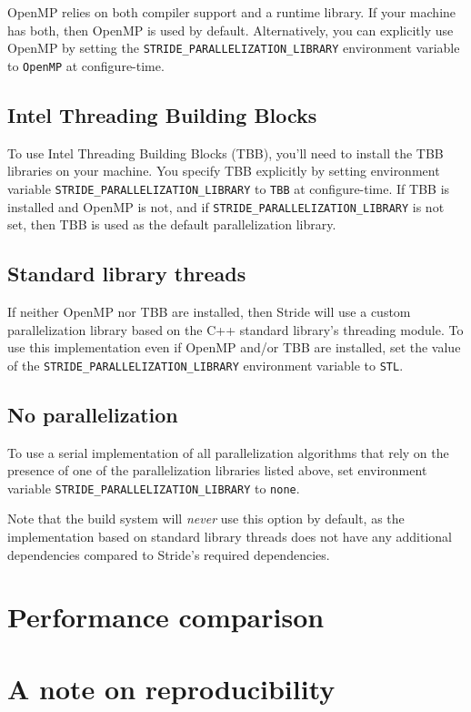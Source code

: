 OpenMP relies on both compiler support and a runtime library. If your machine has both, then OpenMP is used by default. Alternatively, you can explicitly use OpenMP by setting the \texttt{STRIDE\_PARALLELIZATION\_LIBRARY} environment variable to \texttt{OpenMP} at configure-time.

\subsection{Intel Threading Building Blocks}

To use Intel Threading Building Blocks (TBB), you'll need to install the TBB libraries on your machine. You specify TBB explicitly by setting environment variable \texttt{STRIDE\_PARALLELIZATION\_LIBRARY} to \texttt{TBB} at configure-time. If TBB is installed and OpenMP is not, and if \texttt{STRIDE\_PARALLELIZATION\_LIBRARY} is not set, then TBB is used as the default parallelization library.

\subsection{Standard library threads}

If neither OpenMP nor TBB are installed, then Stride will use a custom parallelization library based on the C++ standard library's threading module. To use this implementation even if OpenMP and/or TBB are installed, set the value of the \texttt{STRIDE\_PARALLELIZATION\_LIBRARY} environment variable to \texttt{STL}.

\subsection{No parallelization}

To use a serial implementation of all parallelization algorithms that rely on the presence of one of the parallelization libraries listed above, set environment variable \texttt{STRIDE\_PARALLELIZATION\_LIBRARY} to \texttt{none}.

Note that the build system will \emph{never} use this option by default, as the implementation based on standard library threads does not have any additional dependencies compared to Stride's required dependencies.

\section{Performance comparison}

\section{A note on reproducibility}
